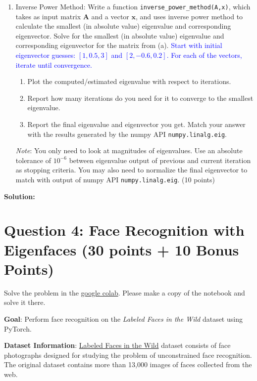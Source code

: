 \documentclass[11pt]{article}
\begin{document}
\begin{enumerate}
    \item[(b)] Inverse Power Method: Write a function \texttt{inverse\_power\_method(A,x)}, which takes as input matrix $\mathbf{A}$ and a vector $\mathbf{x}$, and uses inverse power method to calculate the smallest (in absolute value) eigenvalue and corresponding eigenvector. Solve for the smallest (in absolute value) eigenvalue and corresponding eigenvector for the matrix from (a). \textcolor{blue}{Start with initial eigenvector guesses: $[1, 0.5, 3]$ and $[2,-0.6, 0.2]$. For each of the vectors, iterate until convergence.}
    \begin{enumerate}
        \item[(i)] Plot the computed/estimated eigenvalue with respect to iterations.
        \item[(ii)] Report how many iterations do you need for it to converge to the smallest eigenvalue.
        \item[(iii)] Report the final eigenvalue and eigenvector you get. Match your answer with the results generated by the numpy API \texttt{numpy.linalg.eig}.
    \end{enumerate}
    \emph{Note}: You only need to look at magnitudes of eigenvalues. Use an absolute tolerance of $10^{-6}$ between eigenvalue output of previous and current iteration as stopping criteria. You may also need to normalize the final eigenvector to match with output of numpy API \texttt{numpy.linalg.eig}. (10 points)
\end{enumerate}

\textbf{Solution:}

\bigskip

\newpage
\section*{Question 4: Face Recognition with Eigenfaces (30 points + 10 Bonus Points)}

Solve the problem in the \href{https://drive.google.com/file/d/1HQRlmo1zC6ZyeMCt-B278iOXQMfdmMRJ/view?usp=drive_link}{google colab}. Please make a copy of the notebook and solve it there.

\textbf{Goal}: Perform face recognition on the \emph{Labeled Faces in the Wild} dataset using PyTorch.

\textbf{Dataset Information}: \href{http://vis-www.cs.umass.edu/lfw/}{Labeled Faces in the Wild} dataset consists of face photographs designed for studying the problem of unconstrained face recognition. The original dataset contains more than 13,000 images of faces collected from the web.
\end{document}
